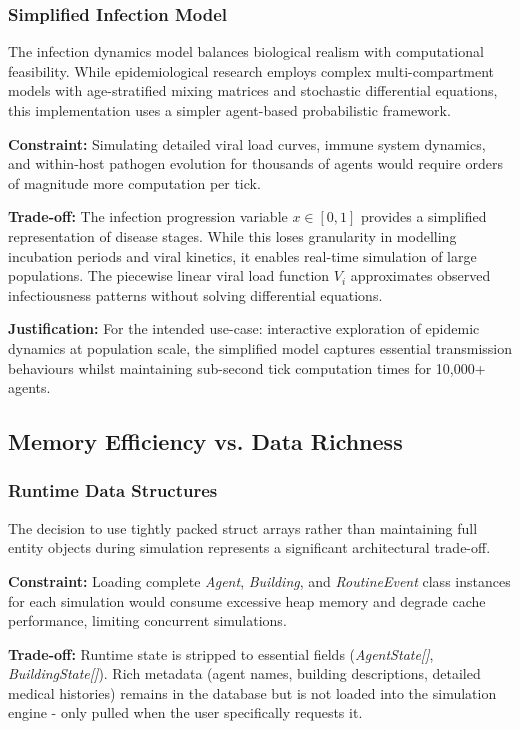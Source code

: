 \subsubsection*{Simplified Infection Model}
The infection dynamics model balances biological realism with computational feasibility. While epidemiological research employs complex multi-compartment models with age-stratified mixing matrices and stochastic differential equations, this implementation uses a simpler agent-based probabilistic framework.

\textbf{Constraint:} Simulating detailed viral load curves, immune system dynamics, and within-host pathogen evolution for thousands of agents would require orders of magnitude more computation per tick.

\textbf{Trade-off:} The infection progression variable $x \in [0,1]$ provides a simplified representation of disease stages. While this loses granularity in modelling incubation periods and viral kinetics, it enables real-time simulation of large populations. The piecewise linear viral load function $V_i$ approximates observed infectiousness patterns without solving differential equations.

\textbf{Justification:} For the intended use-case: interactive exploration of epidemic dynamics at population scale, the simplified model captures essential transmission behaviours whilst maintaining sub-second tick computation times for 10,000+ agents.

\subsection{Memory Efficiency vs. Data Richness}

\subsubsection*{Runtime Data Structures}
The decision to use tightly packed struct arrays rather than maintaining full entity objects during simulation represents a significant architectural trade-off.

\textbf{Constraint:} Loading complete \textit{Agent}, \textit{Building}, and \textit{RoutineEvent} class instances for each simulation would consume excessive heap memory and degrade cache performance, limiting concurrent simulations.

\textbf{Trade-off:} Runtime state is stripped to essential fields (\textit{AgentState[]}, \textit{BuildingState[]}). Rich metadata (agent names, building descriptions, detailed medical histories) remains in the database but is not loaded into the simulation engine - only pulled when the user specifically requests it.

